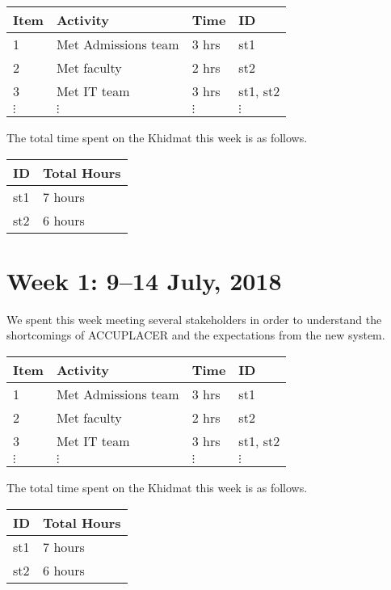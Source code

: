 \documentclass{article}
\begin{document}
\begin{tabular}{|l|l|l|l|}
  \hline
  Item  & Activity & Time & ID \\\hline\hline
  1 & Met Admissions team & 3 hrs & st1 \\\hline
  2 & Met faculty & 2 hrs & st2 \\\hline
  3 & Met IT team & 3 hrs & st1, st2 \\\hline
  $\vdots$ & $\vdots$ & $\vdots$ & $\vdots$ \\\hline
\end{tabular}

The total time spent on the Khidmat this week is as follows.

\begin{tabular}{|l|l|}
  \hline
  ID & Total Hours\\\hline\hline
  st1 & 7 hours\\\hline
  st2 & 6 hours\\\hline
\end{tabular}


\newpage %
\section*{Week 1: 9--14 July, 2018}

We spent this week meeting several stakeholders in order to understand the shortcomings of ACCUPLACER and the expectations from the new system.

\begin{tabular}{|l|l|l|l|}
  \hline
  Item  & Activity & Time & ID \\\hline\hline
  1 & Met Admissions team & 3 hrs & st1 \\\hline
  2 & Met faculty & 2 hrs & st2 \\\hline
  3 & Met IT team & 3 hrs & st1, st2 \\\hline
  $\vdots$ & $\vdots$ & $\vdots$ & $\vdots$ \\\hline
\end{tabular}

The total time spent on the Khidmat this week is as follows.

\begin{tabular}{|l|l|}
  \hline
  ID & Total Hours\\\hline\hline
  st1 & 7 hours\\\hline
  st2 & 6 hours\\\hline
\end{tabular}
\end{document}
